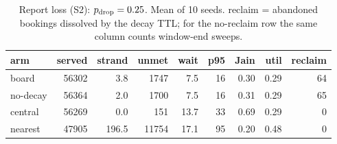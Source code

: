 \begin{table}
\centering
\caption{Report loss (S2): $p_{\rm drop}=0.25$.  Mean of 10 seeds.  reclaim = abandoned bookings
dissolved by the decay TTL; for the no-reclaim row the same column
counts window-end sweeps.}
\label{tab:e3drop}
\begin{tabular}{@{}lrrrrrrrr@{}}
\toprule
arm & served & strand & unmet & wait & p95 & Jain & util & reclaim \\
\midrule
board & 56302 & 3.8 & 1747 & 7.5 & 16 & 0.30 & 0.29 & 64 \\
no-decay & 56364 & 2.0 & 1700 & 7.5 & 16 & 0.31 & 0.29 & 65 \\
central & 56269 & 0.0 & 151 & 13.7 & 33 & 0.69 & 0.29 & 0 \\
nearest & 47905 & 196.5 & 11754 & 17.1 & 95 & 0.20 & 0.48 & 0 \\
\bottomrule
\end{tabular}
\end{table}
